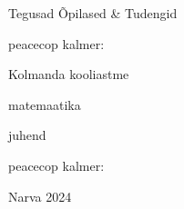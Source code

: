 \begin{titlepage}
\par{Tegusad Õpilased \& Tudengid}
\vspace{0.3\textheight}
\par{peacecop kalmer:}
\LARGE
\par{Kolmanda kooliastme}
\par{matemaatika}
\normalsize
\par{juhend}
\vspace{0.3\textheight}
\begin{flushright}
\par{peacecop kalmer:}
\end{flushright}
\vfill
Narva
\hfill
2024
\end{titlepage}
